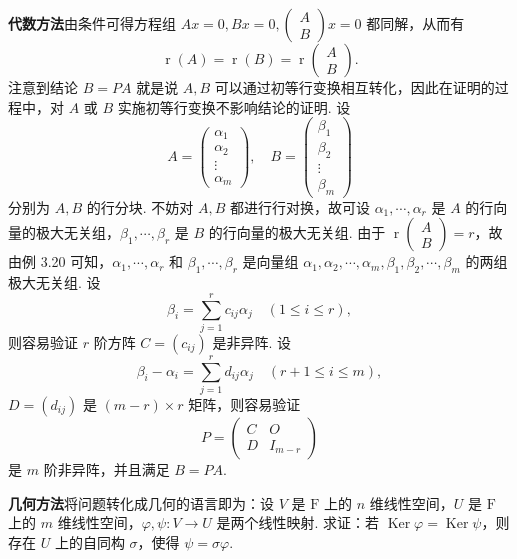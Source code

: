 \documentclass[UTF8, 12pt, fontset=fandol, oneside]{ctexart}
\begin{document}
\noindent\textbf{代数方法}\quad 由条件可得方程组 $Ax=0,Bx=0,\left(\begin{array}{c}A\\B\end{array}\right)x=0$ 都同解，从而有
\[
\operatorname{r}(A)=\operatorname{r}(B)=\operatorname{r}\left(\begin{array}{c}A\\B\end{array}\right).
\]
注意到结论 $B=PA$ 就是说 $A,B$ 可以通过初等行变换相互转化，因此在证明的过程中，对 $A$ 或 $B$ 实施初等行变换不影响结论的证明. 设
\[
A=\left(\begin{array}{c}
\alpha_1\\ \alpha_2\\ \vdots\\ \alpha_m
\end{array}\right),\quad
B=\left(\begin{array}{c}
\beta_1\\ \beta_2\\ \vdots\\ \beta_m
\end{array}\right)
\]
分别为 $A,B$ 的行分块. 不妨对 $A,B$ 都进行行对换，故可设 $\alpha_1,\cdots,\alpha_r$ 是 $A$ 的行向量的极大无关组，$\beta_1,\cdots,\beta_r$ 是 $B$ 的行向量的极大无关组. 由于 $\operatorname{r}\left(\begin{array}{c}A\\B\end{array}\right)=r$，故由例 3.20 可知，$\alpha_1,\cdots,\alpha_r$ 和 $\beta_1,\cdots,\beta_r$ 是向量组 $\alpha_1,\alpha_2,\cdots,\alpha_m,\beta_1,\beta_2,\cdots,\beta_m$ 的两组极大无关组. 设
\[
\beta_i=\sum_{j=1}^r c_{ij}\alpha_j\quad (1\le i\le r),
\]
则容易验证 $r$ 阶方阵 $C=(c_{ij})$ 是非异阵. 设
\[
\beta_i-\alpha_i=\sum_{j=1}^r d_{ij}\alpha_j\quad (r+1\le i\le m),
\]
$D=(d_{ij})$ 是 $(m-r)\times r$ 矩阵，则容易验证
\[
P=\left(\begin{array}{cc}
C & O\\
D & I_{m-r}
\end{array}\right)
\]
是 $m$ 阶非异阵，并且满足 $B=PA$.

\noindent\textbf{几何方法}\quad 将问题转化成几何的语言即为：设 $V$ 是 $\mathrm{F}$ 上的 $n$ 维线性空间，$U$ 是 $\mathrm{F}$ 上的 $m$ 维线性空间，$\varphi,\psi:V\to U$ 是两个线性映射. 求证：若 $\operatorname{Ker}\varphi=\operatorname{Ker}\psi$，则存在 $U$ 上的自同构 $\sigma$，使得 $\psi=\sigma\varphi$.
\end{document}
